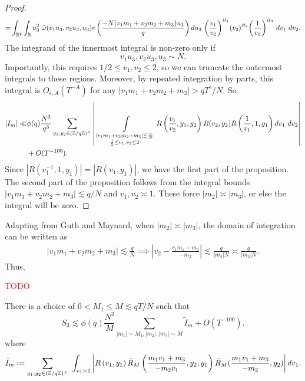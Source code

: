 \begin{proof}
\begin{align*}
    =&\int_{\reals^2}\int_\reals u_3^2 \ \tilde{\omega}(v_1u_3,v_2u_3,u_3) e\left(\frac{-N(v_1m_1+v_2m_2+m_3)u_3}{q}\right)  du_3 \ {\left(\frac{v_1}{v_2}\right)}^{it_1} {\left(v_2\right)}^{it_2}{\left(\frac{1}{v_1}\right)}^{it_3}  \ dv_1\ dv_2.\\
\end{align*}
The integrand of the innermost integral is non-zero only if \[
    v_1u_3,v_2u_3,u_3\sim N.
\]
Importantly, this requires $1/2 \leq v_1,v_2 \leq 2$, so we can truncate the outermost integrals to these regions. Moreover, by repeated integration by parts, this integral is $O_{\epsilon, A}(T^{-A})$ for any $|v_1m_1+v_2m_2+m_3|>qT^\epsilon/N$.
So 
\begin{align*}
    |I_m|\ll &\phi(q) \frac{N^3}{q^3}  
    \sum_{y_1,y_2\in (\mathbb{Z}/q\mathbb{Z})^\times}\left|\ \int\displaylimits_{\substack{
        |v_1m_1+v_2m_2+m_3|\lesssim \frac{q}{N}\\
        \frac{1}{2}\leq v_1,v_2\leq 2
    }} R\left(\frac{v_1}{v_2},y_1,y_2\right)
    R(v_2,y_2)R\left(\frac{1}{v_1},1,y_1\right) dv_1 \ dv_2 \right|\\ &+ O(T^{-100}).\\
\end{align*}
Since $|R(v_1^{-1},1,y_1)|=|R(v_1,y_1)|$, we have the first part of the proposition.
The second part of the proposition follows from the integral bounds $|v_1m_1+v_2m_2+m_3|\lesssim q/N$
 and $v_1,v_2\asymp 1$. These force $|m_2| \asymp|m_3|$, or else the integral will be zero.

\end{proof}

Adapting from Guth and Maynard, when $|m_2|\asymp|m_3|$, the domain of integration can be written as\begin{align*}
    |v_1m_1+v_2m_2+m_3|\lesssim \frac{q}{N} \implies \left|v_2 - \frac{v_1m_1+m_3}{-m_2}\right|\lesssim \frac{q}{|m_2|N} \asymp \frac{q}{|m_3|N}.
\end{align*}
Thus, 


\textcolor{red}{TODO}
\begin{proposition}
    There is a choice of $0<M_1\leq M \lesssim qT/N$ such that \[
        S_3\lesssim \phi(q)\frac{N^2}{M}\sum_{|m_1|\sim M_1,|m_2|,|m_3|\sim M}\tilde{I}_m+O(T^{-100}).
    \]
    where \[
    \tilde{I}_m\mathrel{\mathop:}= \sum_{y_1,y_2\in (\mathbb{Z}/q\mathbb{Z})^\times}\ \int_{v_1\asymp 1} 
         \left|R\left(v_1,y_1\right) \tilde{R}_M\left(\frac{m_1v_1+m_3}{-m_2v_1},y_2,y_1\right)
        \tilde{R}_M(\frac{m_1v_1+m_3}{-m_2},y_2)\right| dv_1.
    \]
\end{proposition}


